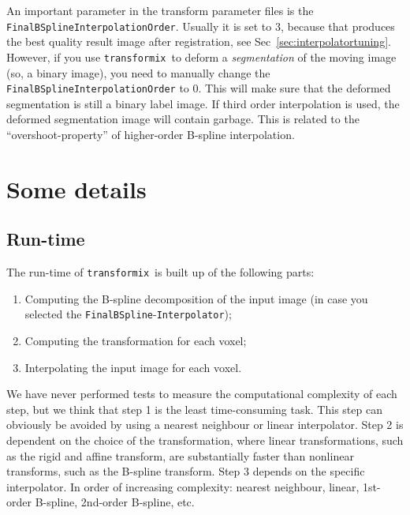 \documentclass[]{report}
\newcommand{\transformix}{\texttt{transformix}}
\begin{document}
An important parameter in the transform parameter files is the
\texttt{FinalBSplineInterpolationOrder}. Usually it is set to 3, because that
produces the best quality result image after registration, see
Sec~\ref{sec:interpolatortuning}. However, if you use \transformix\ to deform a
\emph{segmentation} of the moving image (so, a binary image), you need to
manually change the \texttt{FinalBSplineInterpolationOrder} to 0. This will
make sure that the deformed segmentation is still a binary label image. If
third order interpolation is used, the deformed segmentation image will contain
garbage. This is related to the ``overshoot-property'' of higher-order B-spline
interpolation.

\section{Some details}

\subsection{Run-time}

The run-time of \transformix\ is built up of the following parts:

\begin{enumerate}
\item Computing the B-spline decomposition of the input image (in case you
    selected the \texttt{FinalBSpline}-\texttt{Interpolator});

\item Computing the transformation for each voxel;

\item Interpolating the input image for each voxel.
\end{enumerate}
We have never performed tests to measure the computational
complexity of each step, but we think that step 1 is the least
time-consuming task. This step can obviously be avoided by using a
nearest neighbour or linear interpolator. Step 2 is dependent on the
choice of the transformation, where linear transformations, such as
the rigid and affine transform, are substantially faster than
nonlinear transforms, such as the B-spline transform. Step 3 depends
on the specific interpolator. In order of increasing complexity:
nearest neighbour, linear, 1st-order B-spline, 2nd-order B-spline,
etc.

\end{document}

